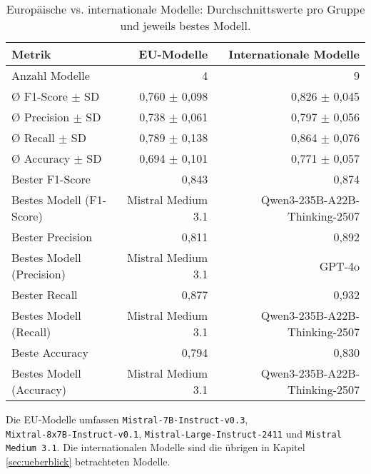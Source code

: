 \begin{table}[htbp]
 \centering
 \caption{Europäische vs. internationale Modelle: Durchschnittswerte pro Gruppe und jeweils bestes Modell.}
 \label{tab:eu-vs-international}
 \begin{adjustbox}{width=\textwidth}
  \begin{threeparttable}[width=\textwidth]
   \begin{tabular}[width=\textwidth]{l r r}
    \toprule
    \textbf{Metrik} & \textbf{\ac{EU}-Modelle} & \textbf{Internationale Modelle} \\
    \midrule
    Anzahl Modelle              & 4                           & 9 \\
    Ø F1-Score $\pm$ SD         & 0{,}760 $\pm$ 0{,}098       & 0{,}826 $\pm$ 0{,}045 \\
    Ø Precision $\pm$ SD        & 0{,}738 $\pm$ 0{,}061       & 0{,}797 $\pm$ 0{,}056 \\
    Ø Recall $\pm$ SD           & 0{,}789 $\pm$ 0{,}138       & 0{,}864 $\pm$ 0{,}076 \\
    Ø Accuracy $\pm$ SD         & 0{,}694 $\pm$ 0{,}101       & 0{,}771 $\pm$ 0{,}057 \\
    Bester F1-Score             & 0{,}843                     & 0{,}874 \\
    Bestes Modell (F1-Score)    & Mistral Medium 3.1          & Qwen3-235B-A22B-Thinking-2507 \\
    Bester Precision            & 0{,}811                     & 0{,}892 \\
    Bestes Modell (Precision)   & Mistral Medium 3.1          & GPT-4o \\
    Bester Recall               & 0{,}877                     & 0{,}932 \\
    Bestes Modell (Recall)      & Mistral Medium 3.1          & Qwen3-235B-A22B-Thinking-2507 \\
    Beste Accuracy              & 0{,}794                     & 0{,}830 \\
    Bestes Modell (Accuracy)    & Mistral Medium 3.1          & Qwen3-235B-A22B-Thinking-2507 \\
    \bottomrule
   \end{tabular}
   \begin{tablenotes}
    \footnotesize
    \item Die \ac{EU}‑Modelle umfassen \texttt{Mistral‑7B‑Instruct‑v0.3}, \texttt{Mixtral‑8x7B‑Instruct‑v0.1}, \texttt{Mistral‑Large‑Instruct‑2411} und \texttt{Mistral Medium 3.1}. Die internationalen Modelle sind die übrigen in Kapitel \ref{sec:ueberblick} betrachteten Modelle.
   \end{tablenotes}
  \end{threeparttable}
 \end{adjustbox}
\end{table}

